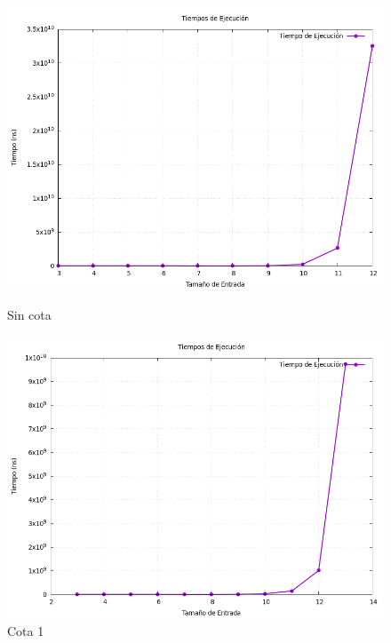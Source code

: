 \documentclass[11pt,openany]{book}
\begin{document}
\begin{figure}[H]
    \centering
    \begin{minipage}{.48\textwidth}
        \centering
        \includegraphics[width=1\linewidth]{assets/Img/grafico_tiempos0.png}
        \caption{Sin cota}
        \label{fig:Sin cota}
  \end{minipage}%
    \begin{minipage}{.48\textwidth}
          \centering
          \includegraphics[width=1\linewidth]{assets/Img/grafico_tiempos1.png}
          \caption{Cota 1}
          \label{fig:Cota 1}
    \end{minipage}%
\end{figure}
    
\end{document}
